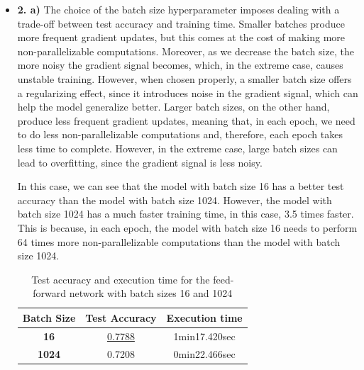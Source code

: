 \documentclass[12pt]{article}
\begin{document}
\begin{itemize}
    \item \textbf{2. a)}
          The choice of the batch size hyperparameter imposes dealing with a trade-off between test accuracy and training time. Smaller batches produce more frequent gradient updates, but this comes at the cost of making more non-parallelizable computations. Moreover, as we decrease the batch size, the more noisy the gradient signal becomes, which, in the extreme case, causes unstable training. However, when chosen properly, a smaller batch size offers a regularizing effect, since it introduces noise in the gradient signal, which can help the model generalize better. Larger batch sizes, on the other hand, produce less frequent gradient updates, meaning that, in each epoch, we need to do less non-parallelizable computations and, therefore, each epoch takes less time to complete. However, in the extreme case, large batch sizes can lead to overfitting, since the gradient signal is less noisy.

          In this case, we can see that the model with batch size 16 has a better test accuracy than the model with batch size 1024. However, the model with batch size 1024 has a much faster training time, in this case, 3.5 times faster. This is because, in each epoch, the model with batch size 16 needs to perform 64 times more non-parallelizable computations than the model with batch size 1024.

          \begin{table}[H]
              \centering
              \begin{tabular}{|c|cc|}
                  \toprule
                  \textbf{Batch Size} & \textbf{Test Accuracy} & \textbf{Execution time} \\
                  \midrule
                  \textbf{16}         & \underline{0.7788}     & 1min17.420sec           \\
                  \textbf{1024}       & 0.7208                 & 0min22.466sec           \\
                  \bottomrule
              \end{tabular}
              \caption{Test accuracy and execution time for the feed-forward network with batch sizes 16 and 1024}
              \label{tab:2.2a}
          \end{table}


\end{itemize}
\end{document}
